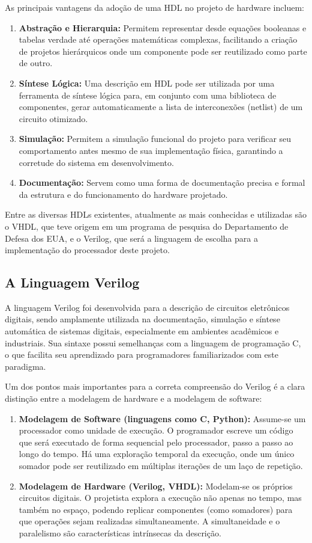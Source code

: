 \documentclass[
	12pt,				%
	oneside,
	a4paper,			%
	english,			%
	french,				%
	spanish,			%
	brazil,				%
	]{abntex2}
\begin{document}
As principais vantagens da adoção de uma HDL no projeto de hardware incluem:

\begin {enumerate}
    \item \textbf{Abstração e Hierarquia:} Permitem representar desde equações booleanas e tabelas verdade até operações matemáticas complexas, facilitando a criação de projetos hierárquicos onde um componente pode ser reutilizado como parte de outro.
    \item \textbf{Síntese Lógica:} Uma descrição em HDL pode ser utilizada por uma ferramenta de síntese lógica para, em conjunto com uma biblioteca de componentes, gerar automaticamente a lista de interconexões (netlist) de um circuito otimizado.
    \item \textbf{Simulação:} Permitem a simulação funcional do projeto para verificar seu comportamento antes mesmo de sua implementação física, garantindo a corretude do sistema em desenvolvimento.
    \item \textbf{Documentação:} Servem como uma forma de documentação precisa e formal da estrutura e do funcionamento do hardware projetado.
\end{enumerate}

Entre as diversas HDLs existentes, atualmente as mais conhecidas e utilizadas são o VHDL, que teve origem em um programa de pesquisa do Departamento de Defesa dos EUA, e o Verilog, que será a linguagem de escolha para a implementação do processador deste projeto.

\subsection{A Linguagem Verilog}
A linguagem Verilog foi desenvolvida para a descrição de circuitos eletrônicos digitais, sendo amplamente utilizada na documentação, simulação e síntese automática de sistemas digitais, especialmente em ambientes acadêmicos e industriais. Sua sintaxe possui semelhanças com a linguagem de programação C, o que facilita seu aprendizado para programadores familiarizados com este paradigma.

Um dos pontos mais importantes para a correta compreensão do Verilog é a clara distinção entre a modelagem de hardware e a modelagem de software:
\begin{enumerate}
    \item \textbf{Modelagem de Software (linguagens como C, Python):} Assume-se um processador como unidade de execução. O programador escreve um código que será executado de forma sequencial pelo processador, passo a passo ao longo do tempo. Há uma exploração temporal da execução, onde um único somador pode ser reutilizado em múltiplas iterações de um laço de repetição.
    \item \textbf{Modelagem de Hardware (Verilog, VHDL):}  Modelam-se os próprios circuitos digitais. O projetista explora a execução não apenas no tempo, mas também no espaço, podendo replicar componentes (como somadores) para que operações sejam realizadas simultaneamente. A simultaneidade e o paralelismo são características intrínsecas da descrição.
\end{enumerate}
\end{document}
